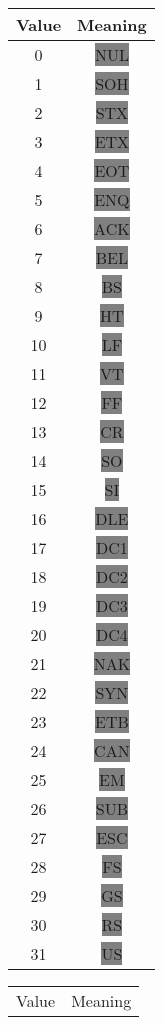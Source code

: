 {\ttfamily\begin{tabular}{c c}
  \hline
  Value & Meaning \\
  \hline
    0 & \colorbox{gray}{NUL} \\
    1 & \colorbox{gray}{SOH} \\
    2 & \colorbox{gray}{STX} \\
    3 & \colorbox{gray}{ETX} \\
    4 & \colorbox{gray}{EOT} \\
    5 & \colorbox{gray}{ENQ} \\
    6 & \colorbox{gray}{ACK} \\
    7 & \colorbox{gray}{BEL} \\
    8 & \colorbox{gray}{BS} \\
    9 & \colorbox{gray}{HT} \\
   10 & \colorbox{gray}{LF} \\
   11 & \colorbox{gray}{VT} \\
   12 & \colorbox{gray}{FF} \\
   13 & \colorbox{gray}{CR} \\
   14 & \colorbox{gray}{SO} \\
   15 & \colorbox{gray}{SI} \\
   16 & \colorbox{gray}{DLE} \\
   17 & \colorbox{gray}{DC1} \\
   18 & \colorbox{gray}{DC2} \\
   19 & \colorbox{gray}{DC3} \\
   20 & \colorbox{gray}{DC4} \\
   21 & \colorbox{gray}{NAK} \\
   22 & \colorbox{gray}{SYN} \\
   23 & \colorbox{gray}{ETB} \\
   24 & \colorbox{gray}{CAN} \\
   25 & \colorbox{gray}{EM} \\
   26 & \colorbox{gray}{SUB} \\
   27 & \colorbox{gray}{ESC} \\
   28 & \colorbox{gray}{FS} \\
   29 & \colorbox{gray}{GS} \\
   30 & \colorbox{gray}{RS} \\
   31 & \colorbox{gray}{US} \\
\end{tabular}
\quad
\begin{tabular}{c c}
  \hline
  Value & Meaning \\

\end{tabular}}
